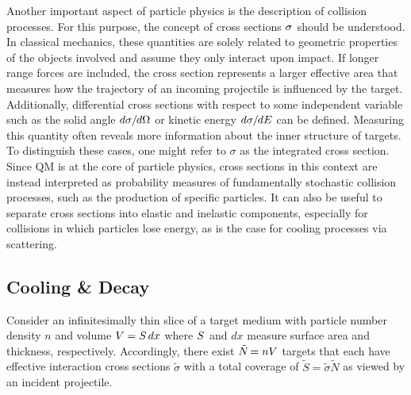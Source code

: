 \begin{spacing}{0.985}
	Another important aspect of particle physics is the description of collision processes. For this purpose, the concept of cross
	sections $\sigma \kern+0.5pt$ should be understood. In classical mechanics, these quantities are solely related to geometric
	properties of the objects involved and assume they only interact upon impact. If longer range forces are included, the
	cross section represents a larger effective area that measures how the trajectory of an incoming projectile is influenced by
	the target. Additionally, differential cross sections with respect to some independent variable such as the solid angle
	$d\sigma \kern-0.3pt / \kern-0.6pt d\Omega$ or kinetic energy $d\sigma \kern-0.3pt / \kern-0.6pt dE$ can be defined.
	Measuring this quantity often reveals more information about the inner structure of targets. To distinguish these cases,
	one might refer to $\sigma$ as the integrated cross section. Since QM is at the core of particle physics, cross sections in this
	context are instead interpreted as probability measures of fundamentally stochastic collision processes, such as the production
	of specific particles. It can also be useful to separate cross sections into elastic and inelastic components, especially for
	collisions in which particles lose energy, as is the case for cooling processes via scattering.



	\subsection{Cooling \& Decay}
	\label{sub:cooling}

	Consider an infinitesimally thin slice of a target medium with particle number density $n$ and volume $V \kern-0.1pt = S \kern+1.5pt dx$
	where $S \kern+0.5pt$ and $dx$ measure surface area and thickness, respectively. Accordingly, there exist $\tilde{N} \kern-1.2pt = nV$
	targets that each have effective interaction cross sections $\tilde{\sigma}$ with a total coverage of $\tilde{S} = \tilde{\sigma} \tilde{N}$
	as viewed by an incident projectile.
	\enlargethispage{\baselineskip}\newpage
\end{spacing}

